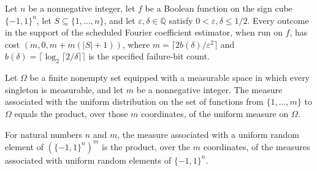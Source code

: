 \begin{theorem}
\label{FABL.scheduledFourierCoeffEstimatorProgram_cost_eq}
\leanok
{}
Let $n$ be a nonnegative integer, let $f$ be a Boolean function on the sign cube
$\{-1,1\}^n$, let $S\subseteq\{1,\ldots,n\}$, and let $\varepsilon,\delta\in\mathbb Q$
satisfy $0<\varepsilon,\delta\le 1/2$. Every outcome in the support of the scheduled
Fourier coefficient estimator, when run on $f$, has cost $(m,0,m+m(|S|+1))$, where
$m=\lceil 2b(\delta)/\varepsilon^2\rceil$ and $b(\delta)=\lceil\log_2\lceil
2/\delta\rceil\rceil$ is the specified failure-bit count.
\end{theorem}

\begin{theorem}
\label{FABL.uniformSample_toMeasure_eq_pi}
\leanok
{}
Let $\Omega$ be a finite nonempty set equipped with a measurable space in which every
singleton is measurable, and let $m$ be a nonnegative integer. The measure associated
with the uniform distribution on the set of functions from $\{1,\ldots,m\}$ to $\Omega$
equals the product, over those $m$ coordinates, of the uniform measure on $\Omega$.
\end{theorem}

\begin{theorem}
\label{FABL.uniformSampleInputs_toMeasure_eq_pi}
\leanok
{}
For natural numbers $n$ and $m$, the measure associated with a uniform random element of
$(\{−1,1\}^n)^m$ is the product, over the $m$ coordinates, of the measures associated
with uniform random elements of $\{−1,1\}^n$.
\end{theorem}


